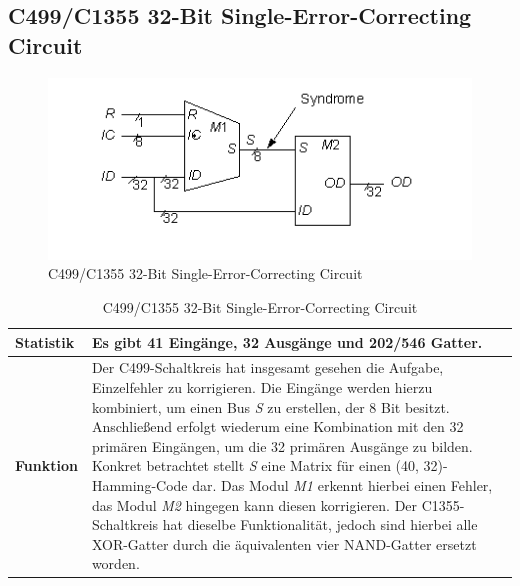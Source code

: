 \subsection*{C499/C1355 32-Bit Single-Error-Correcting Circuit}
\label{sec:c499/c1355}
\begin{figure}[bth]
	\centering
	\includegraphics[scale=0.7]{./img/c499}
	\caption[C499/C1355 32-Bit Single-Error-Correcting Circuit]{C499/C1355 32-Bit Single-Error-Correcting Circuit \cite{h1999}}
	\label{fig:c499/c1355}
\end{figure}
\begin{table}[bth]
	\centering
	\caption{C499/C1355 32-Bit Single-Error-Correcting Circuit}
	\label{tab:c499/c1355}
	\begin{tabular}{ | p{2cm} | p{12cm} |}
		\hline
		\textbf{Statistik} & Es gibt 41 Eingänge, 32 Ausgänge und 202/546 Gatter. \\\hline
		\textbf{Funktion} & Der C499-Schaltkreis hat insgesamt gesehen die Aufgabe, Einzelfehler zu korrigieren. Die Eingänge werden hierzu kombiniert, um einen Bus \emph{S} zu erstellen, der 8 Bit besitzt. Anschließend erfolgt wiederum eine Kombination mit den 32 primären Eingängen, um die 32 primären Ausgänge zu bilden. Konkret betrachtet stellt \emph{S} eine Matrix für einen (40, 32)-Hamming-Code dar. Das Modul \emph{M1} erkennt hierbei einen Fehler, das Modul \emph{M2} hingegen kann diesen korrigieren. Der C1355-Schaltkreis hat dieselbe Funktionalität, jedoch sind hierbei alle XOR-Gatter durch die äquivalenten vier NAND-Gatter ersetzt worden.\\\hline
	\end{tabular}
\end{table}
\newpage
